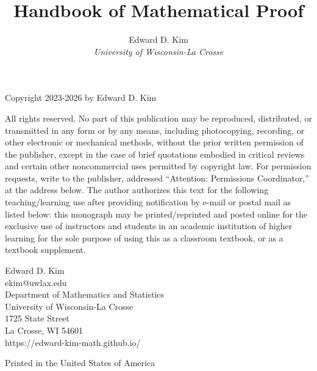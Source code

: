 \documentclass{book}
\theoremstyle{ekimcustom}
\begin{document}
\frontmatter

\title{Handbook of Mathematical Proof}
\author{Edward D. Kim\\\sl{University of Wisconsin-La Crosse}}
\date{}

\maketitle


\noindent
Copyright \textcopyright{} 2023-2026 by Edward D. Kim

\vskip24pt\noindent
All rights reserved. No part of this publication may be reproduced, distributed, or transmitted in any form or by any means, including photocopying, recording, or other electronic or mechanical methods, without the prior written permission of the publisher, except in the case of brief quotations embodied in critical reviews and certain other noncommercial uses permitted by copyright law. For permission requests, write to the publisher, addressed ``Attention: Permissions Coordinator,'' at the address below. The author authorizes this text for the following teaching/learning use after providing notification by e-mail or postal mail as listed below: this monograph may be printed/reprinted and posted online for the exclusive use of instructors and students in an academic institution of higher learning for the sole purpose of using this as a classroom textbook, or as a textbook supplement.

\vfill

\vskip24pt\noindent
Edward D. Kim\\
ekim@uwlax.edu\\
Department of Mathematics and Statistics\\
University of Wisconsin-La Crosse\\
1725 State Street\\
La Crosse, WI 54601\\
https://edward-kim-math.github.io/


\vskip24pt\noindent
Printed in the United States of America
\end{document}
